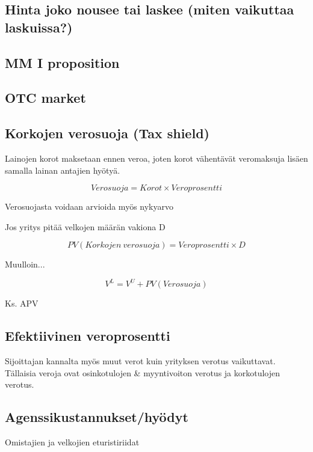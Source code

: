 \documentclass[a4paper]{article}
\begin{document}
\subsection{Hinta joko nousee tai laskee (miten vaikuttaa laskuissa?)}


\subsection{MM I proposition}

\subsection{OTC market}

\subsection{Korkojen verosuoja (Tax shield)}

Lainojen korot maksetaan ennen veroa, joten korot vähentävät veromaksuja lisäen samalla lainan antajien hyötyä.

\[ Verosuoja = Korot \times Veroprosentti \]

Verosuojasta voidaan arvioida myös nykyarvo

Jos yritys pitää velkojen määrän vakiona D

\[ PV(Korkojen\ verosuoja) = Veroprosentti \times D \]

Muulloin...

\[ V^L = V^U + PV(Verosuoja) \]

Ks. APV

\subsection{Efektiivinen veroprosentti}

Sijoittajan kannalta myös muut verot kuin yrityksen verotus vaikuttavat. Tällaisia veroja ovat osinkotulojen & myyntivoiton verotus ja korkotulojen verotus.

\subsection{Agenssikustannukset/hyödyt}

Omistajien ja velkojien eturistiriidat
\end{document}
